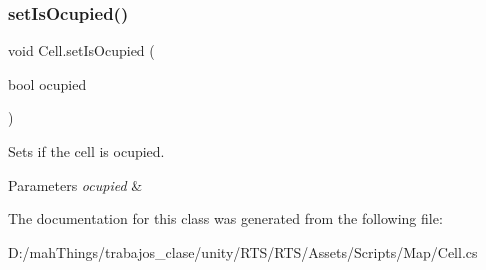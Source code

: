 \subsubsection{\texorpdfstring{set\+Is\+Ocupied()}{setIsOcupied()}}
{\footnotesize\ttfamily void Cell.\+set\+Is\+Ocupied (\begin{DoxyParamCaption}\item[{bool}]{ocupied }\end{DoxyParamCaption})}



Sets if the cell is ocupied. 


\begin{DoxyParams}{Parameters}
{\em ocupied} & \\
\hline
\end{DoxyParams}


The documentation for this class was generated from the following file\+:\begin{DoxyCompactItemize}
\item 
D\+:/mah\+Things/trabajos\+\_\+clase/unity/\+R\+T\+S/\+R\+T\+S/\+Assets/\+Scripts/\+Map/Cell.\+cs\end{DoxyCompactItemize}
